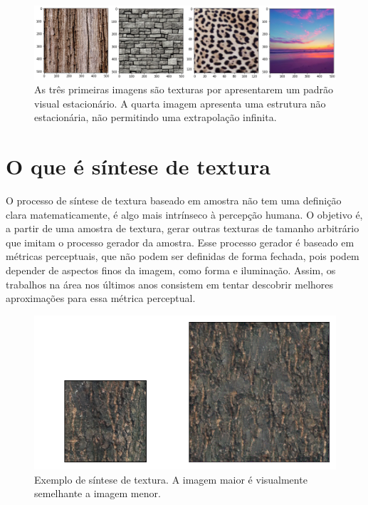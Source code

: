 \begin{figure}[!ht]
	\includegraphics[width=\linewidth]{files/assets/texture.png}
	\caption{As três primeiras imagens são texturas por apresentarem
	um padrão visual estacionário. A quarta imagem apresenta
    uma estrutura não estacionária, não permitindo uma extrapolação
	infinita.}
	\label{img:preview}
\end{figure}


 

\section{O que é síntese de textura}


O processo de síntese de textura baseado
em amostra não tem uma definição clara
matematicamente, é algo mais intrínseco
à percepção humana. O objetivo é,
a partir de uma amostra de textura,
gerar outras texturas de tamanho
arbitrário que imitam o processo
gerador da amostra. Esse processo
gerador é baseado em métricas
perceptuais, que não podem ser
definidas de forma fechada, pois
podem depender de aspectos
finos da imagem, como forma e 
iluminação.
Assim, os trabalhos na área
nos últimos anos consistem em
tentar descobrir melhores aproximações
para essa métrica perceptual.

\begin{figure}[!ht]
	\centering
	\includegraphics[width=\linewidth*2/3]{files/assets/sinth.png}
	\caption{Exemplo de síntese de textura. A imagem
	maior é visualmente semelhante a imagem menor.}
	\label{img:preview}
\end{figure}


